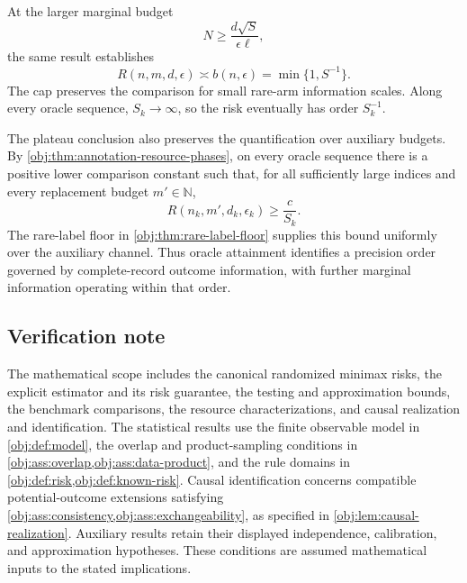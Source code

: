 At the larger marginal budget
\[
N\ge \frac{d\sqrt{S}}{\epsilon\ell},
\]
the same result establishes
\[
R(n,m,d,\epsilon)\asymp b(n,\epsilon)
=\min\{1,S^{-1}\}.
\]
The cap preserves the comparison for small rare-arm information scales. Along every oracle sequence, \(S_k\to\infty\), so the risk eventually has order \(S_k^{-1}\).

The plateau conclusion also preserves the quantification over auxiliary budgets. By \cref{obj:thm:annotation-resource-phases}, on every oracle sequence there is a positive lower comparison constant such that, for all sufficiently large indices and every replacement budget \(m'\in\mathbb N\),
\[
R(n_k,m',d_k,\epsilon_k)\ge \frac{c}{S_k}.
\]
The rare-label floor in \cref{obj:thm:rare-label-floor} supplies this bound uniformly over the auxiliary channel. Thus oracle attainment identifies a precision order governed by complete-record outcome information, with further marginal information operating within that order.

\subsection{Verification note}

The mathematical scope includes the canonical randomized minimax risks, the explicit estimator and its risk guarantee, the testing and approximation bounds, the benchmark comparisons, the resource characterizations, and causal realization and identification. The statistical results use the finite observable model in \cref{obj:def:model}, the overlap and product-sampling conditions in \cref{obj:ass:overlap,obj:ass:data-product}, and the rule domains in \cref{obj:def:risk,obj:def:known-risk}. Causal identification concerns compatible potential-outcome extensions satisfying \cref{obj:ass:consistency,obj:ass:exchangeability}, as specified in \cref{obj:lem:causal-realization}. Auxiliary results retain their displayed independence, calibration, and approximation hypotheses. These conditions are assumed mathematical inputs to the stated implications.
